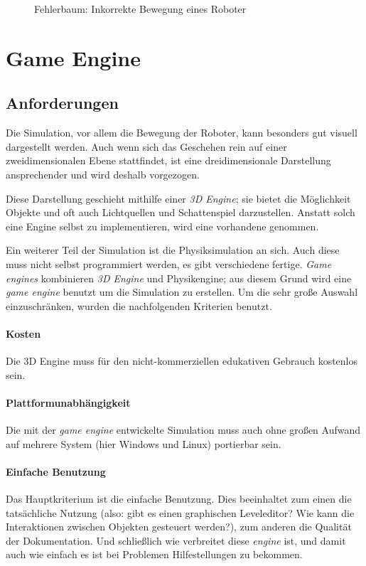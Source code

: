 \begin{figure}
	\centering
	\caption{Fehlerbaum: Inkorrekte Bewegung eines Roboter}
	\label{fig:fault-tree-robot2}
\end{figure}

\clearpage
\section{Game Engine}
\subsection{Anforderungen}
Die Simulation, vor allem die Bewegung der Roboter, kann besonders gut visuell dargestellt werden.
Auch wenn sich das Geschehen rein auf einer zweidimensionalen Ebene stattfindet, ist eine dreidimensionale
Darstellung ansprechender und wird deshalb vorgezogen.

Diese Darstellung geschieht mithilfe einer \textit{3D Engine}; sie bietet die M{\"{o}}glichkeit Objekte und oft 
auch Lichtquellen und Schattenspiel darzustellen. Anstatt solch eine Engine selbst zu implementieren, wird eine 
vorhandene genommen.

Ein weiterer Teil der Simulation ist die Physiksimulation an sich. Auch diese muss nicht selbst programmiert
werden, es gibt verschiedene fertige. \textit{Game engines} kombinieren \textit{3D Engine} und Physikengine;
aus diesem Grund wird eine \textit{game engine} benutzt um die Simulation zu erstellen. Um die sehr gro{\ss}e 
Auswahl einzuschr{\"{a}}nken, wurden die nachfolgenden Kriterien benutzt.

\paragraph{Kosten} Die 3D Engine muss f{\"{u}}r den nicht-kommerziellen edukativen Gebrauch kostenlos sein.

\paragraph{Plattformunabh{\"{a}}ngigkeit} Die mit der \textit{game engine} entwickelte Simulation muss auch
ohne gro{\ss}en Aufwand auf mehrere System (hier Windows und Linux) portierbar sein.

\paragraph{Einfache Benutzung} Das Hauptkriterium ist die einfache Benutzung. Dies beeinhaltet zum einen die
tats{\"{a}}chliche Nutzung (also: gibt es einen graphischen Leveleditor? Wie kann die Interaktionen zwischen
Objekten gesteuert werden?), zum anderen die Qualit{\"{a}}t der Dokumentation. Und schlie{\ss}lich wie verbreitet diese
\textit{engine} ist, und damit auch wie einfach es ist bei Problemen Hilfestellungen zu bekommen.


